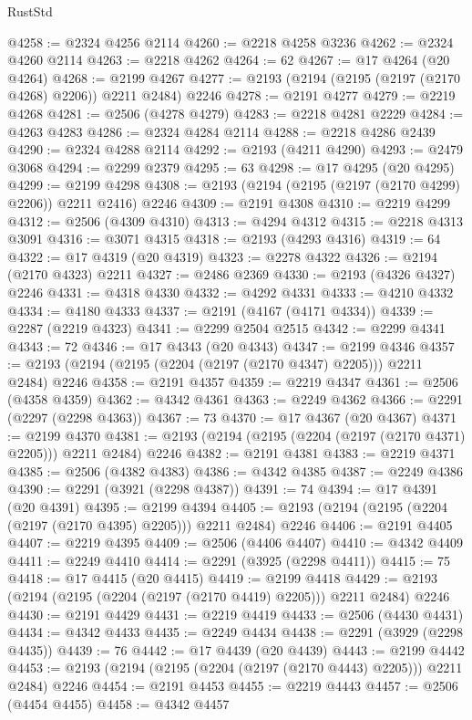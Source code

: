 \begin{lexlean}{RustStd}
\begin{coremodule}
{\begin{coremodule}
{{{{{{{{{{{{{{{{{{{{{{{{{{@4258 := @2324 @4256 @2114
@4260 := @2218 @4258 @3236
@4262 := @2324 @4260 @2114
@4263 := @2218 @4262
@4264 := 62
@4267 := @17 @4264 (@20 @4264)
@4268 := @2199 @4267
@4277 := @2193 (@2194 (@2195 (@2197 (@2170 @4268) @2206)) @2211 @2484) @2246
@4278 := @2191 @4277
@4279 := @2219 @4268
@4281 := @2506 (@4278 @4279)
@4283 := @2218 @4281 @2229
@4284 := @4263 @4283
@4286 := @2324 @4284 @2114
@4288 := @2218 @4286 @2439
@4290 := @2324 @4288 @2114
@4292 := @2193 (@4211 @4290)
@4293 := @2479 @3068
@4294 := @2299 @2379
@4295 := 63
@4298 := @17 @4295 (@20 @4295)
@4299 := @2199 @4298
@4308 := @2193 (@2194 (@2195 (@2197 (@2170 @4299) @2206)) @2211 @2416) @2246
@4309 := @2191 @4308
@4310 := @2219 @4299
@4312 := @2506 (@4309 @4310)
@4313 := @4294 @4312
@4315 := @2218 @4313 @3091
@4316 := @3071 @4315
@4318 := @2193 (@4293 @4316)
@4319 := 64
@4322 := @17 @4319 (@20 @4319)
@4323 := @2278 @4322
@4326 := @2194 (@2170 @4323) @2211
@4327 := @2486 @2369
@4330 := @2193 (@4326 @4327) @2246
@4331 := @4318 @4330
@4332 := @4292 @4331
@4333 := @4210 @4332
@4334 := @4180 @4333
@4337 := @2191 (@4167 (@4171 @4334))
@4339 := @2287 (@2219 @4323)
@4341 := @2299 @2504 @2515
@4342 := @2299 @4341
@4343 := 72
@4346 := @17 @4343 (@20 @4343)
@4347 := @2199 @4346
@4357 := @2193 (@2194 (@2195 (@2204 (@2197 (@2170 @4347) @2205))) @2211 @2484) @2246
@4358 := @2191 @4357
@4359 := @2219 @4347
@4361 := @2506 (@4358 @4359)
@4362 := @4342 @4361
@4363 := @2249 @4362
@4366 := @2291 (@2297 (@2298 @4363))
@4367 := 73
@4370 := @17 @4367 (@20 @4367)
@4371 := @2199 @4370
@4381 := @2193 (@2194 (@2195 (@2204 (@2197 (@2170 @4371) @2205))) @2211 @2484) @2246
@4382 := @2191 @4381
@4383 := @2219 @4371
@4385 := @2506 (@4382 @4383)
@4386 := @4342 @4385
@4387 := @2249 @4386
@4390 := @2291 (@3921 (@2298 @4387))
@4391 := 74
@4394 := @17 @4391 (@20 @4391)
@4395 := @2199 @4394
@4405 := @2193 (@2194 (@2195 (@2204 (@2197 (@2170 @4395) @2205))) @2211 @2484) @2246
@4406 := @2191 @4405
@4407 := @2219 @4395
@4409 := @2506 (@4406 @4407)
@4410 := @4342 @4409
@4411 := @2249 @4410
@4414 := @2291 (@3925 (@2298 @4411))
@4415 := 75
@4418 := @17 @4415 (@20 @4415)
@4419 := @2199 @4418
@4429 := @2193 (@2194 (@2195 (@2204 (@2197 (@2170 @4419) @2205))) @2211 @2484) @2246
@4430 := @2191 @4429
@4431 := @2219 @4419
@4433 := @2506 (@4430 @4431)
@4434 := @4342 @4433
@4435 := @2249 @4434
@4438 := @2291 (@3929 (@2298 @4435))
@4439 := 76
@4442 := @17 @4439 (@20 @4439)
@4443 := @2199 @4442
@4453 := @2193 (@2194 (@2195 (@2204 (@2197 (@2170 @4443) @2205))) @2211 @2484) @2246
@4454 := @2191 @4453
@4455 := @2219 @4443
@4457 := @2506 (@4454 @4455)
@4458 := @4342 @4457
}}}}}}}}}}}}}}}}}}}}}}}}}}
\end{coremodule}}
\end{coremodule}
\end{lexlean}
